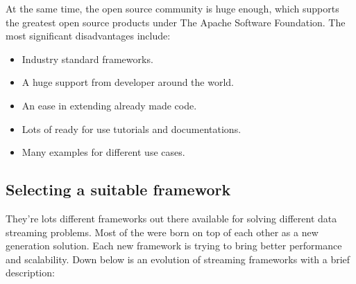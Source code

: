 At the same time, the open source community is huge enough, which supports the greatest
open source products under The Apache Software Foundation.
The most significant disadvantages include:

\begin{itemize}
    \item Industry standard frameworks.
    \item A huge support from developer around the world.
    \item An ease in extending already made code.
    \item Lots of ready for use tutorials and documentations.
    \item Many examples for different use cases.
\end{itemize}


\newpage
\subsection{Selecting a suitable framework}\label{subsec:selecting-a-suitable-framework}
They're lots different frameworks out there available for solving different
data streaming problems.
Most of the were born on top of each other as a new generation solution.
Each new framework is trying to bring better performance and scalability.
Down below is an evolution of streaming frameworks with a brief description:

